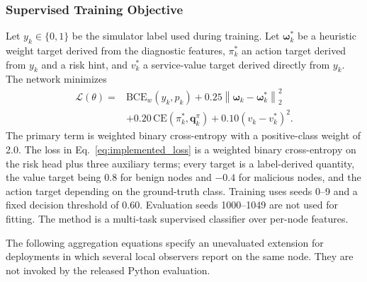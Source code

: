 \documentclass[notspecified,article,submit,moreauthors]{Definitions/mdpi}
\begin{document}
\subsubsection{Supervised Training Objective}
\label{sec:reward}
Let $y_k \in \{0,1\}$ be the simulator label used during training. Let $\boldsymbol{\omega}_k^{*}$ be a heuristic weight target derived from the diagnostic features, $\pi_k^{*}$ an action target derived from $y_k$ and a risk hint, and $v_k^{*}$ a service-value target derived directly from $y_k$. The network minimizes
\begin{equation}
\begin{aligned}
\mathcal{L}(\theta) ={}& \mathrm{BCE}_{w}(y_k,p_k)
 + 0.25 \left\|\boldsymbol{\omega}_k-\boldsymbol{\omega}_k^{*}\right\|_2^2\\
&+ 0.20\,\mathrm{CE}(\pi_k^{*},\mathbf{q}_k^{\pi})
 + 0.10 \left(v_k-v_k^{*}\right)^2 .
\end{aligned}
\label{eq:implemented_loss}
\end{equation}
The primary term is weighted binary cross-entropy with a positive-class weight of 2.0. The loss in Eq.~\ref{eq:implemented_loss} is a weighted binary cross-entropy on the risk head plus three auxiliary terms; every target is a label-derived quantity, the value target being $0.8$ for benign nodes and $-0.4$ for malicious nodes, and the action target depending on the ground-truth class. Training uses seeds 0--9 and a fixed decision threshold of 0.60. Evaluation seeds 1000--1049 are not used for fitting. The method is a multi-task supervised classifier over per-node features.

The following aggregation equations specify an unevaluated extension for deployments in which several local observers report on the same node. They are not invoked by the released Python evaluation.
\end{document}
